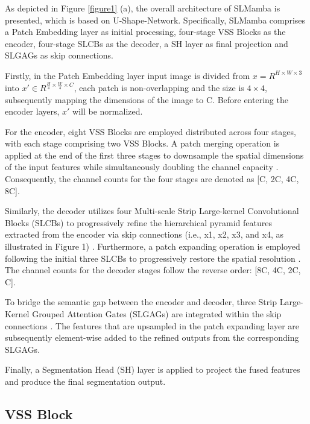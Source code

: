 \documentclass[runningheads]{llncs}
\begin{document}
As depicted in Figure \textcolor{red}{\ref{figure1}} (a), the overall architecture of SLMamba is presented, which is based on U-Shape-Network\cite{ronneberger2015unet}. Specifically, SLMamba comprises a Patch Embedding layer as initial processing, four-stage VSS Blocks\cite{liu2024vmamba,gu2023mamba} as the encoder, four-stage SLCBs as the decoder, a SH layer as final projection and SLGAGs as skip connections.

Firstly, in the Patch Embedding layer input image is divided from 
$x=R^{H\times W\times 3} $
into
${x}{'}\in {R}^{\frac{H}{4} \times \frac{W}{4} \times C}$, each patch is non-overlapping and the size is $4 \times 4$, subsequently mapping the dimensions of the image to C. Before entering the encoder layers, ${x}{'}$ will be normalized.

For the encoder, eight VSS Blocks are employed distributed across four stages, with each stage comprising two VSS Blocks. A patch merging operation is applied at the end of the first three stages to downsample the spatial dimensions of the input features while simultaneously doubling the channel capacity \cite{liu2021swin}. Consequently, the channel counts for the four stages are denoted as [C, 2C, 4C, 8C].

Similarly, the decoder utilizes four Multi-scale Strip Large-kernel Convolutional Blocks (SLCBs) to progressively refine the hierarchical pyramid features extracted from the encoder via skip connections (i.e., x1, x2, x3, and x4, as illustrated in Figure 1) \cite{lin2017feature}. Furthermore, a patch expanding operation is employed following the initial three SLCBs to progressively restore the spatial resolution \cite{cao2023swin}. The channel counts for the decoder stages follow the reverse order: [8C, 4C, 2C, C].

To bridge the semantic gap between the encoder and decoder, three Strip Large-Kernel Grouped Attention Gates (SLGAGs) are integrated within the skip connections \cite{oktay2018attention}. The features that are upsampled in the patch expanding layer are subsequently element-wise added to the refined outputs from the corresponding SLGAGs.

Finally, a Segmentation Head (SH) layer is applied to project the fused features and produce the final segmentation output.

\subsection{VSS Block}
\end{document}
